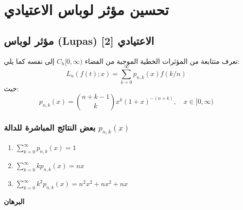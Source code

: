 \chapter{تحسين مؤثر لوباس الاعتيادي}
\section{مؤثر لوباس (Lupas) الاعتيادي [2]}

تعرف متتابعة من المؤثرات الخطية الموجبة من الفضاء $C_h[0, \infty)$ إلى نفسه كما يلي:
\[
L_n(f(t); x) = \sum_{k=0}^{\infty} p_{n,k} (x) f(k/n)
\]
حيث:
\[
p_{n,k} (x) = \binom{n+k-1}{k} x^k (1+x)^{-(n+k)}, \quad x \in [0, \infty)
\]

\subsection*{بعض النتائج المباشرة للدالة $p_{n,k}(x)$}
\begin{english}
	\begin{enumerate}[label=\arabic*)]
		\item $\sum_{k=0}^{\infty} p_{n,k}(x) = 1$
		\item $\sum_{k=0}^{\infty}k p_{n,k}(x) = nx$
		\item $\sum_{k=0}^{\infty}k^2 p_{n,k}(x) = n^2 x^2 + nx^2 + nx$
	\end{enumerate}
\end{english}
\noindent
\textbf{البرهان}

